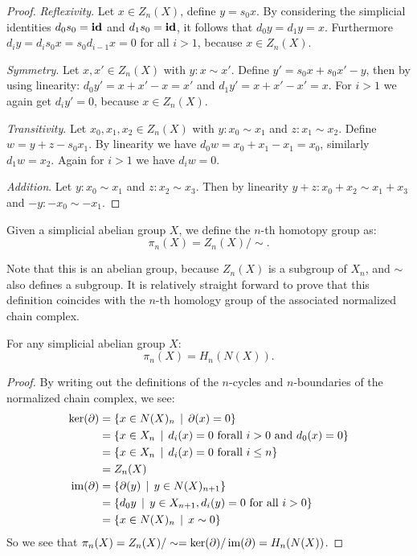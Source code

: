 \begin{proof}
	\emph{Reflexivity}. Let $x \in Z_n(X)$, define $y = s_0 x$. By considering the simplicial identities $d_0 s_0 = \mathbf{id}$ and $d_1 s_0 = \mathbf{id}$, it follows that $d_0 y = d_1 y = x$. Furthermore $d_i y = d_i s_0 x = s_0 d_{i-1} x = 0$ for all $i > 1$, because $x \in Z_n(X)$.

	\emph{Symmetry}. Let $x, x' \in Z_n(X)$ with $y: x \sim x'$. Define $y' = s_0 x + s_0 x' - y$, then by using linearity: $d_0 y' = x + x' - x = x'$ and $d_1 y' = x + x' - x' = x$. For $i>1$ we again get $d_i y' = 0$, because $x \in Z_n(X)$.

	\emph{Transitivity}. Let $x_0, x_1, x_2 \in Z_n(X)$ with $y: x_0 \sim x_1$ and $z: x_1 \sim x_2$. Define $w = y + z - s_0 x_1$. By linearity we have $d_0 w = x_0 + x_1 -x_1 = x_0$, similarly $d_1 w = x_2$. Again for $i>1$ we have $d_i w = 0$.

	\emph{Addition}. Let $y: x_0 \sim x_1$ and $z: x_2 \sim x_3$. Then by linearity $y + z: x_0 + x_2 \sim x_1 + x_3$ and $-y: -x_0 \sim -x_1$.
\end{proof}

\begin{definition}
	Given a simplicial abelian group $X$, we define the $n$-th homotopy group as:
	$$ \pi_n(X) = Z_n(X) / \sim. $$
\end{definition}

Note that this is an abelian group, because $Z_n(X)$ is a subgroup of $X_n$, and $\sim$ also defines a subgroup. It is relatively straight forward to prove that this definition coincides with the $n$-th homology group of the associated normalized chain complex.

\begin{lemma}
	For any simplicial abelian group $X$:
	$$ \pi_n(X) = H_n(N(X)). $$
\end{lemma}
\begin{proof}
	By writing out the definitions of the $n$-cycles and $n$-boundaries of the normalized chain complex, we see:
	\begin{align*}
		\ker(\partial) &= \{ x \in N(X)_n \,\mid\, \partial(x) = 0 \} \\
			&= \{ x \in X_n \,\mid\, d_i(x) = 0 \text{ forall } i > 0 \text{ and } d_0(x) = 0 \} \\
			&= \{ x \in X_n \,\mid\, d_i(x) = 0 \text{ forall } i \leq n \} \\
			&= Z_n(X) \\
		\operatorname{im}(\partial) &= \{ \partial(y) \,\mid\, y \in N(X)_{n+1} \} \\
			&= \{ d_0 y \,\mid\, y \in X_{n+1}, d_i(y) = 0 \text{ for all } i > 0 \} \\
			&= \{ x \in N(X)_n \,\mid\, x \sim 0 \}
	\end{align*}
	So we see that $\pi_n(X) = Z_n(X) / \sim = \ker(\partial) / \operatorname{im}(\partial) = H_n(N(X))$.
\end{proof}

